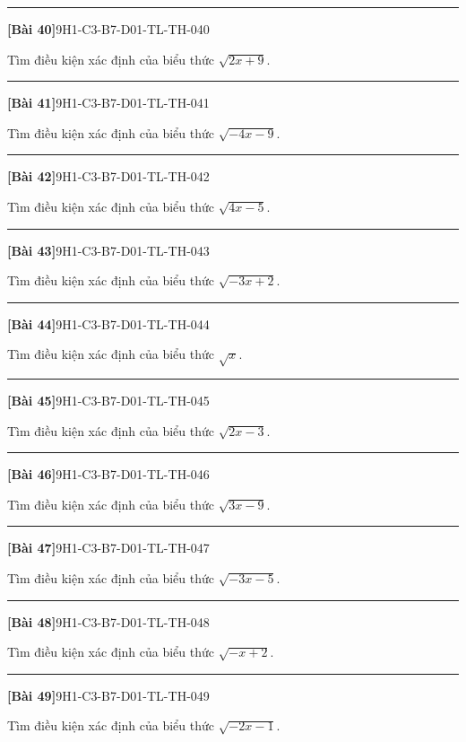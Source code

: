 \documentclass[12pt,a4paper]{article}
\newif\ifloigiai
\newenvironment{cauhoi}[2]{%
  \par\medskip\noindent\rule{\textwidth}{0.4pt}\par\nopagebreak
  \noindent\textbf{[#1]}\hfill{\scriptsize\ttfamily #2}\par\nopagebreak\smallskip}{\par}
\newcommand{\loigiai}[1]{\ifloigiai\par\smallskip\noindent\textit{Lời giải.} #1\par\fi}
\begin{document}
\begin{cauhoi}{Bài 40}{9H1-C3-B7-D01-TL-TH-040}
Tìm điều kiện xác định của biểu thức $\sqrt{2x + 9}$.
\loigiai{Biểu thức xác định khi $2x + 9\ge 0$, tức là $x\ge -\dfrac{9}{2}$.}
\end{cauhoi}
\begin{cauhoi}{Bài 41}{9H1-C3-B7-D01-TL-TH-041}
Tìm điều kiện xác định của biểu thức $\sqrt{-4x - 9}$.
\loigiai{Biểu thức xác định khi $-4x - 9\ge 0$, tức là $4x\le -9$, suy ra $x\le -\dfrac{9}{4}$.}
\end{cauhoi}
\begin{cauhoi}{Bài 42}{9H1-C3-B7-D01-TL-TH-042}
Tìm điều kiện xác định của biểu thức $\sqrt{4x - 5}$.
\loigiai{Biểu thức xác định khi $4x - 5\ge 0$, tức là $x\ge \dfrac{5}{4}$.}
\end{cauhoi}
\begin{cauhoi}{Bài 43}{9H1-C3-B7-D01-TL-TH-043}
Tìm điều kiện xác định của biểu thức $\sqrt{-3x + 2}$.
\loigiai{Biểu thức xác định khi $-3x + 2\ge 0$, tức là $3x\le 2$, suy ra $x\le \dfrac{2}{3}$.}
\end{cauhoi}
\begin{cauhoi}{Bài 44}{9H1-C3-B7-D01-TL-TH-044}
Tìm điều kiện xác định của biểu thức $\sqrt{x}$.
\loigiai{Biểu thức xác định khi $x\ge 0$, tức là $x\ge 0$.}
\end{cauhoi}
\begin{cauhoi}{Bài 45}{9H1-C3-B7-D01-TL-TH-045}
Tìm điều kiện xác định của biểu thức $\sqrt{2x - 3}$.
\loigiai{Biểu thức xác định khi $2x - 3\ge 0$, tức là $x\ge \dfrac{3}{2}$.}
\end{cauhoi}
\begin{cauhoi}{Bài 46}{9H1-C3-B7-D01-TL-TH-046}
Tìm điều kiện xác định của biểu thức $\sqrt{3x - 9}$.
\loigiai{Biểu thức xác định khi $3x - 9\ge 0$, tức là $x\ge 3$.}
\end{cauhoi}
\begin{cauhoi}{Bài 47}{9H1-C3-B7-D01-TL-TH-047}
Tìm điều kiện xác định của biểu thức $\sqrt{-3x - 5}$.
\loigiai{Biểu thức xác định khi $-3x - 5\ge 0$, tức là $3x\le -5$, suy ra $x\le -\dfrac{5}{3}$.}
\end{cauhoi}
\begin{cauhoi}{Bài 48}{9H1-C3-B7-D01-TL-TH-048}
Tìm điều kiện xác định của biểu thức $\sqrt{-x + 2}$.
\loigiai{Biểu thức xác định khi $-x + 2\ge 0$, tức là $x\le 2$, suy ra $x\le 2$.}
\end{cauhoi}
\begin{cauhoi}{Bài 49}{9H1-C3-B7-D01-TL-TH-049}
Tìm điều kiện xác định của biểu thức $\sqrt{-2x - 1}$.
\loigiai{Biểu thức xác định khi $-2x - 1\ge 0$, tức là $2x\le -1$, suy ra $x\le -\dfrac{1}{2}$.}
\end{cauhoi}
\end{document}
